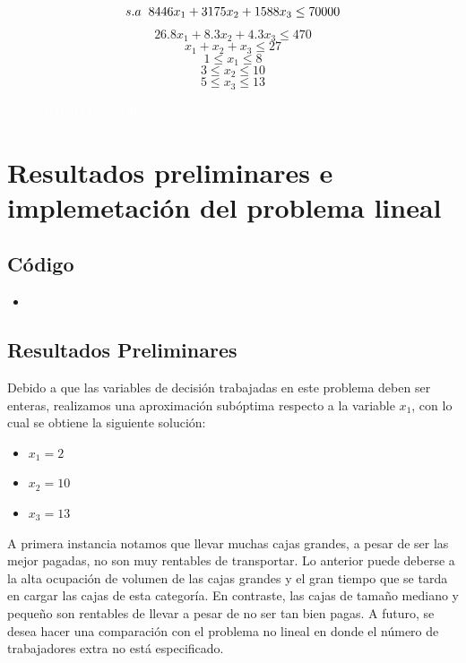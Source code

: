 \documentclass[11pt]{article}
\begin{document}
\[s.a \hspace{0.2cm}8446x_1 + 3175x_2 + 1588x_3 \leq 70000\]
\[26.8x_1 + 8.3x_2 + 4.3x_3 \leq 470\]
\[x_1 + x_2 + x_3 \leq 27\]
\[1 \leq x_1 \leq 8\]
\[3 \leq x_2 \leq 10\]
\[5 \leq x_3 \leq 13\]
\justify

\newpage
\begin{itemize}
    \item[\textcolor{white}{ESPACIO}] \textcolor{white}{ESPACIO}
\end{itemize}

\section{Resultados preliminares e implemetación del problema lineal}

\subsection{Código}
{\Large
\begin{itemize}
    \item {}

\end{itemize}}

\subsection{Resultados Preliminares}

Debido a que las variables de decisión trabajadas en este problema deben ser enteras, realizamos una aproximación subóptima respecto a la variable $x_1$, con lo cual se obtiene la siguiente solución: 

\begin{itemize}



    \item $x_1 = 2$
    
    \item $x_2 = 10$
    
    \item $x_3 = 13$
    
\end{itemize}

A primera instancia notamos que llevar muchas cajas grandes, a pesar de ser las mejor pagadas, no son muy rentables de transportar. Lo anterior puede deberse a la alta ocupación de volumen de las cajas grandes y el gran tiempo que se tarda en cargar las cajas de esta categoría. En contraste, las cajas de tamaño mediano y pequeño son rentables de llevar a pesar de no ser tan bien pagas. A futuro, se desea hacer una comparación con el problema no lineal en donde el número de trabajadores extra no está especificado.
\end{document}
